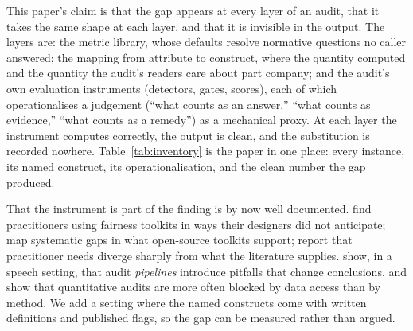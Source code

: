 \documentclass[sigconf,nonacm]{acmart}
\begin{document}
This paper's claim is that the gap appears at every layer of an audit, that it
takes the same shape at each layer, and that it is invisible in the output.
The layers are: the metric library, whose defaults resolve normative questions
no caller answered; the mapping from attribute to construct, where the
quantity computed and the quantity the audit's readers care about part
company; and the audit's own evaluation instruments (detectors, gates,
scores), each of which operationalises a judgement (``what counts as an
answer,'' ``what counts as evidence,'' ``what counts as a remedy'') as a
mechanical proxy. At each layer the instrument computes correctly, the output
is clean, and the substitution is recorded nowhere.
Table~\ref{tab:inventory} is the paper in one place: every instance, its
named construct, its operationalisation, and the clean number the gap
produced.

That the instrument is part of the finding is by now well documented.
\citet{deng2022} find practitioners using fairness toolkits in ways their
designers did not anticipate; \citet{leesingh2021} map systematic gaps in what
open-source toolkits support; \citet{holstein2019} report that practitioner
needs diverge sharply from what the literature supplies. \citet{mei2025} show,
in a speech setting, that audit \emph{pipelines} introduce pitfalls that change
conclusions, and \citet{zaccour2025} show that quantitative audits are more
often blocked by data access than by method. We add a setting where the named
constructs come with written definitions and published flags, so the gap can
be measured rather than argued.
\end{document}
